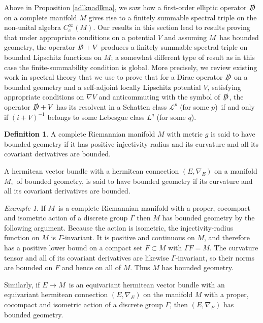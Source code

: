 \documentclass[a4paper,reqno]{amsart}
\numberwithin{equation}{section}
\theoremstyle{definition}
\newtheorem{definition}[thm]{Definition}
\theoremstyle{remark}
\newtheorem{example}[thm]{Example}
\begin{document}
Above in Proposition \ref{adlknadlkna}, we saw how a first-order elliptic operator $\slashed{D}$ on a complete manifold $M$ gives rise to a finitely summable spectral triple on the non-unital algebra $C^\infty_c(M)$. Our results in this section lead to results proving that under appropriate conditions on a potential $V$ and assuming $M$ has bounded geometry, the operator $\slashed{D}+V$ produces a finitely summable spectral triple on bounded Lipschitz functions on $M$; a somewhat different type of result as in this case the finite-summability condition is global. More precisely, we review existing work in spectral theory that we use to prove that for a Dirac operator $\slashed{D}$ on a bounded geometry and a self-adjoint locally Lipschitz potential $V$, satisfying appropriate conditions on $\nabla V$ and anticommuting with the symbol of $\slashed{D}$, the operator $\slashed{D}+V$ has its resolvent in a Schatten class $\mathcal{L}^p$ (for some $p$) if and only if $(i+V)^{-1}$ belongs to some Lebesgue class $L^q$ (for some $q$). 


\begin{definition}
A complete Riemannian manifold $M$ with metric $g$ is said to have bounded geometry if it has positive injectivity radius and its curvature and all its covariant derivatives are bounded. 


A hermitean vector bundle with a hermitean connection $(E,\nabla_E)$ on a manifold $M$, of bounded geometry, is said to have bounded geometry if its curvature and all its covariant derivatives are bounded. 
\end{definition}


\begin{example}
If $M$ is a complete Riemannian manifold with a proper, cocompact and isometric action of a discrete group $\Gamma$ then $M$ has bounded geometry by the following argument. Because the action is isometric, the injectivity-radius function on $M$ is $\Gamma$-invariant. It is positive and continuous on $M$, and therefore has
a positive lower bound on a compact set $F\subset M$ with $\Gamma F=M$. The curvature tensor and all of its covariant derivatives are likewise $\Gamma$-invariant, so their norms are bounded on $F$ and hence on all of $M$. Thus $M$ has bounded geometry.



Similarly, if $E\to M$ is an equivariant hermitean vector bundle with an equivariant hermitean connection $(E,\nabla_E)$ on the manifold $M$ with a proper, cocompact and isometric action of a discrete group $\Gamma$, then $(E,\nabla_E)$ has bounded geometry.
\end{example}
\end{document}
